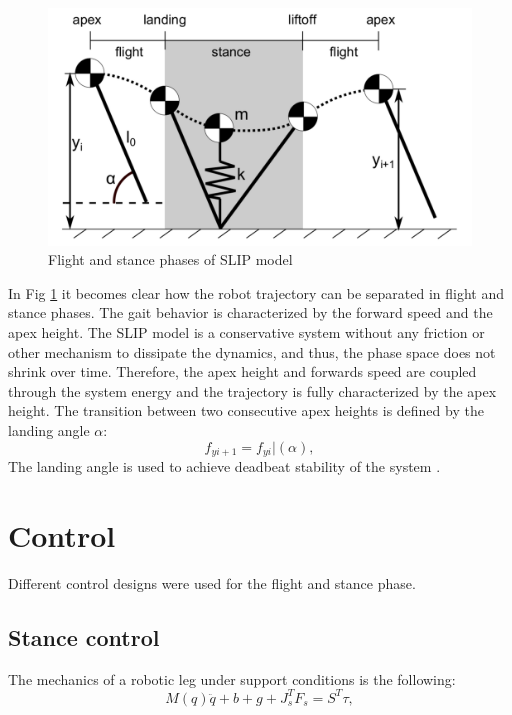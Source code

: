 \documentclass[journal,onecolumn]{IEEEtran}
\begin{document}
	\begin{figure}[h]
		\centering
		\includegraphics[scale=0.2]{"assets/SMM2.pdf"}
		\caption{Flight and stance phases of SLIP model \cite{Wu2014}}
		\label{fig_SLIP_phase}
	\end{figure}
	
	
	In Fig \ref{fig_SLIP_phase} it becomes clear how the robot trajectory can be separated in flight and stance phases. The gait behavior is characterized by the forward speed and the apex height.
	The SLIP model is a conservative system without any friction or other mechanism to dissipate the dynamics, and thus, the phase space does not shrink over time. 
	Therefore, the apex height and forwards speed are coupled through the system energy and the trajectory is fully characterized by the apex height. 
	The transition between two consecutive apex heights is defined by the landing angle \(\alpha\):
	\begin{equation}
	{f}_{yi+1}={f}_{yi}|(\alpha),
	\end{equation}
	The landing angle is used to achieve deadbeat stability of the system \cite{Wu2014} \cite{Hutter2010}.
	
	
	
	
	\section{Control}
	\label{sec:Control}
	Different control designs were used for the flight and stance phase. 
	
	\subsection{Stance control}
	The mechanics of a robotic leg under support conditions is the following:
	\begin{equation}
	M(q)\ddot{q}+b+g+{J}_{s}^{T}F_{s}=S^{T}{\tau},
	\end{equation}
	
\end{document}
